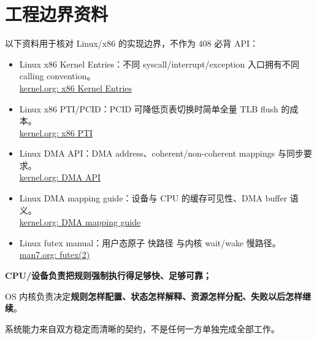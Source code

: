 \documentclass[11pt,a4paper]{ctexart}
\begin{document}
\section*{工程边界资料}
以下资料用于核对 Linux/x86 的实现边界，不作为 408 必背 API：
\begin{itemize}
  \item Linux x86 Kernel Entries：不同 syscall/interrupt/exception 入口拥有不同 calling convention。\\
  \href{https://www.kernel.org/doc/html/v6.2/x86/entry_64.html}{kernel.org: x86 Kernel Entries}
  \item Linux x86 PTI/PCID：PCID 可降低页表切换时简单全量 TLB flush 的成本。\\
  \href{https://origin.kernel.org/doc/html/latest/arch/x86/pti.html}{kernel.org: x86 PTI}
  \item Linux DMA API：DMA address、coherent/non-coherent mappings 与同步要求。\\
  \href{https://www.kernel.org/doc/html/latest/core-api/dma-api.html}{kernel.org: DMA API}
  \item Linux DMA mapping guide：设备与 CPU 的缓存可见性、DMA buffer 语义。\\
  \href{https://www.kernel.org/doc/html/latest/core-api/dma-api-howto.html}{kernel.org: DMA mapping guide}
  \item Linux futex manual：用户态原子 快路径 与内核 wait/wake 慢路径。\\
  \href{https://man7.org/linux/man-pages/man2/futex.2.html}{man7.org: futex(2)}
\end{itemize}

\begin{corebox}[核心结论]
\begin{center}
\Large\bfseries
CPU/设备负责把规则\textbf{强制执行得足够快、足够可靠}；\par
OS 内核负责决定\textbf{规则怎样配置、状态怎样解释、资源怎样分配、失败以后怎样继续}。
\end{center}
系统能力来自双方稳定而清晰的契约，不是任何一方单独完成全部工作。
\end{corebox}
\end{document}
